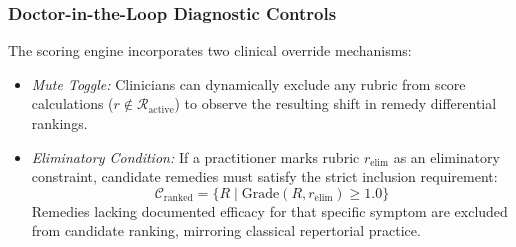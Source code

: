 \subsubsection{Doctor-in-the-Loop Diagnostic Controls}
The scoring engine incorporates two clinical override mechanisms:
\begin{itemize}
    \item \textit{Mute Toggle:} Clinicians can dynamically exclude any rubric from score calculations ($r \notin \mathcal{R}_{\text{active}}$) to observe the resulting shift in remedy differential rankings.
    \item \textit{Eliminatory Condition:} If a practitioner marks rubric $r_{\text{elim}}$ as an eliminatory constraint, candidate remedies must satisfy the strict inclusion requirement:
    \begin{equation}
        \mathcal{C}_{\text{ranked}} = \{R \mid \text{Grade}(R, r_{\text{elim}}) \ge 1.0\}
    \end{equation}
    Remedies lacking documented efficacy for that specific symptom are excluded from candidate ranking, mirroring classical repertorial practice.
\end{itemize}
